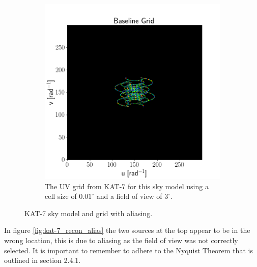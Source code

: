 \begin{figure}[H]
\begin{subfigure}[b]{0.49\textwidth}
    \includegraphics[scale=0.3]{images/KAT_7_4_POINT_GRID_ALIASING.png}
    \caption{The UV grid from KAT-7 for this sky model using a cell size of $0.01^\circ$ and a field of view of $3^\circ$.}
    \label{fig:kat-7_grid_alias}
  \end{subfigure}
  \caption{KAT-7 sky model and grid with aliasing.}
  \label{fig:kat-7_alias}
 \end{figure}

In figure \ref{fig:kat-7_recon_alias} the two sources at the top appear to be in the wrong location, this is due to aliasing as the field of view was not correctly selected. It is important to remember to adhere to the Nyquist Theorem that is outlined in section 2.4.1.

